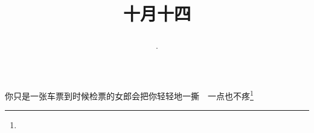 \title{\date[d=14,m=11,y=2024][year:cn-y,年,month:cn,day:cn,日,·,weekday]·十月十四 }
你只是一张车票到时候检票的女郎会把你轻轻地一撕　一点也不疼\footnote{ }

